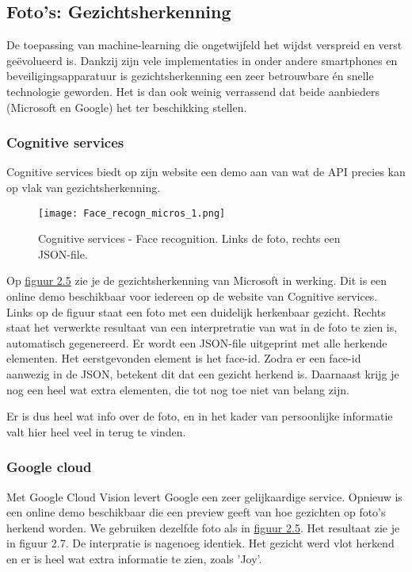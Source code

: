 \subsection{Foto's: Gezichtsherkenning}
De toepassing van machine-learning die ongetwijfeld het wijdst verspreid en verst geëvolueerd is. Dankzij zijn vele implementaties in onder andere smartphones en beveiligingsapparatuur is gezichtsherkenning een zeer betrouwbare én snelle technologie geworden. Het is dan ook weinig verrassend dat beide aanbieders (Microsoft en Google) het ter beschikking stellen. 

\subsubsection{Cognitive services}
Cognitive services biedt op zijn website een demo aan van wat de API precies kan op vlak van gezichtsherkenning.   


\begin{figure}[h]
	\texttt{[image: Face\_recogn\_micros\_1.png]}
	\caption{Cognitive services - Face recognition. Links de foto, rechts een JSON-file.}
	\label{fig:cognitive}
\end{figure}

Op \hyperref[fig:cognitive]{figuur 2.5} zie je de gezichtsherkenning van Microsoft in werking. Dit is een online demo beschikbaar voor iedereen op de website van Cognitive services. Links op de figuur staat een foto met een duidelijk herkenbaar gezicht. Rechts staat het verwerkte resultaat van een interpretratie van wat in de foto te zien is, automatisch gegenereerd. Er wordt een JSON-file uitgeprint met alle herkende elementen. Het eerstgevonden element is het face-id. Zodra er een face-id aanwezig in de JSON, betekent dit dat een gezicht herkend is. Daarnaast krijg je nog een heel wat extra elementen, die tot nog toe niet van belang zijn. 

Er is dus heel wat info over de foto, en in het kader van persoonlijke informatie valt hier heel veel in terug te vinden. 

\subsubsection{Google cloud}
Met Google Cloud Vision levert Google een zeer gelijkaardige service. Opnieuw is een online demo beschikbaar die een preview geeft van hoe gezichten op foto's herkend worden. We gebruiken dezelfde foto als in \hyperref[fig:cognitive2]{figuur 2.5}. Het resultaat zie je in figuur 2.7. De interpratie is nagenoeg identiek. Het gezicht werd vlot herkend en er is heel wat extra informatie te zien, zoals 'Joy'. 

